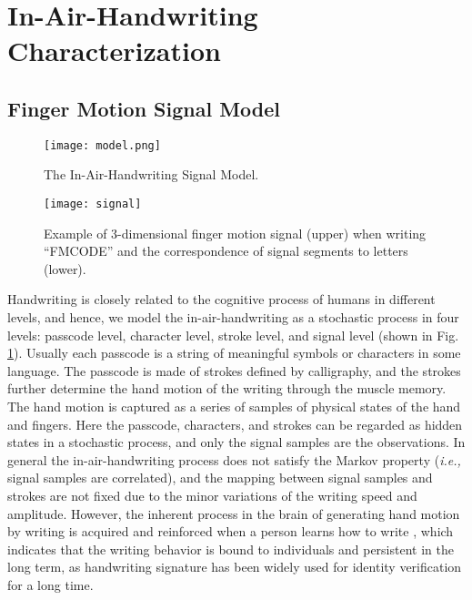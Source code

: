 \documentclass[conference]{IEEEtran}
\begin{document}
\section{In-Air-Handwriting Characterization}

\subsection{Finger Motion Signal Model}


\begin{figure}[!t]
\centering
\texttt{[image: model.png]}
\caption{The In-Air-Handwriting Signal Model.}
\label{fig:model}
\end{figure}


\begin{figure}[!t]
\centering
\texttt{[image: signal]}
\caption{Example of 3-dimensional finger motion signal (upper) when writing ``FMCODE'' and the correspondence of signal segments to letters (lower).}
\label{fig:signal}
\end{figure}


Handwriting is closely related to the cognitive process of humans \cite{Itaguchi} in different levels, and hence, we model the in-air-handwriting as a stochastic process in four levels: passcode level, character level, stroke level, and signal level (shown in Fig. \ref{fig:model}). Usually each passcode is a string of meaningful symbols or characters in some language. The passcode is made of strokes defined by calligraphy, and the strokes further determine the hand motion of the writing through the muscle memory. The hand motion is captured as a series of samples of physical states of the hand and fingers. Here the passcode, characters, and strokes can be regarded as hidden states in a stochastic process, and only the signal samples are the observations. In general the in-air-handwriting process does not satisfy the Markov property (\textit{i.e.,} signal samples are correlated), and the mapping between signal samples and strokes are not fixed due to the minor variations of the writing speed and amplitude. However, the inherent process in the brain of generating hand motion by writing is acquired and reinforced when a person learns how to write \cite{Klemmer}, which indicates that the writing behavior is bound to individuals and persistent in the long term, as handwriting signature has been widely used for identity verification for a long time.
\end{document}
